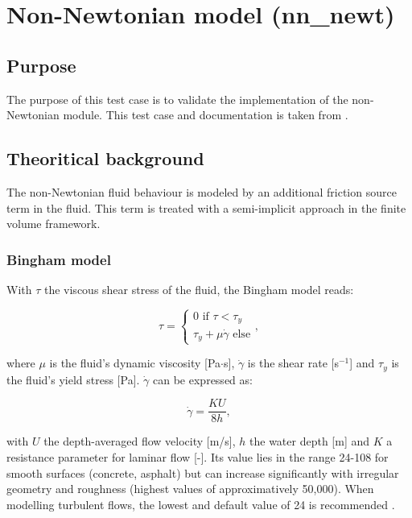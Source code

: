 \chapter{Non-Newtonian model (nn\_newt)}
\label{chapter:nnnewt}

\section{Purpose}

The purpose of this test case is to validate the implementation of the
non-Newtonian module.
This test case and documentation is taken from \cite{Ligier2020}.

\section{Theoritical background}

The non-Newtonian fluid behaviour is modeled by an additional friction source
term in the fluid.
This term is treated with a semi-implicit approach in the finite volume framework.

\subsection{Bingham model}

With $\tau$ the viscous shear stress of the fluid, the Bingham model reads:

\begin{equation}
\tau=\left\{
\begin{array}{l}
0 \text{ if } \tau<\tau_y \\
\tau_y+\mu\dot{\gamma} \text{ else}
\end{array}
\right.,
\label{eq:bingham}
\end{equation}

where $\mu$ is the fluid’s dynamic viscosity [Pa$\cdot$s], $\dot{\gamma}$ is the
shear rate [s$^{-1}$] and $\tau_y$ is the fluid’s yield stress [Pa].
$\dot{\gamma}$ can be expressed as:

\begin{equation}
\dot{\gamma}=\frac{KU}{8h},
\end{equation}

with $U$ the depth-averaged flow velocity [m/s], $h$ the water depth [m] and $K$
a resistance parameter for laminar flow [-].
Its value lies in the range 24-108 for smooth surfaces (concrete, asphalt) but
can increase significantly with irregular geometry and roughness (highest values
of approximatively 50,000). When modelling turbulent flows, the lowest and
default value of 24 is recommended \cite{Ligier2020}.

